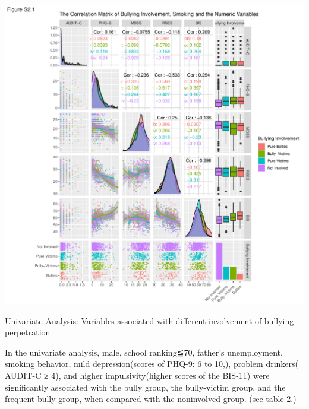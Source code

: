 \documentclass[
]{article}
\newenvironment{Shaded}{\begin{snugshade}}{\end{snugshade}}
\newcommand{\DataTypeTok}[1]{\textcolor[rgb]{0.13,0.29,0.53}{#1}}
\newcommand{\DecValTok}[1]{\textcolor[rgb]{0.00,0.00,0.81}{#1}}
\newcommand{\KeywordTok}[1]{\textcolor[rgb]{0.13,0.29,0.53}{\textbf{#1}}}
\newcommand{\NormalTok}[1]{#1}
\newcommand{\OperatorTok}[1]{\textcolor[rgb]{0.81,0.36,0.00}{\textbf{#1}}}
\begin{document}
\includegraphics{Manuscript_files/figure-latex/unnamed-chunk-2-1.pdf}

Univariate Analysis: Variables associated with different involvement of
bullying perpetration

In the univariate analysis, male, school ranking≦70, father's
unemployment, smoking behavior, mild depression(scores of PHQ-9: 6 to
10,), problem drinkers( AUDIT-C ≥ 4), and higher impulsivity(higher
scores of the BIS-11) were significantly associated with the bully
group, the bully-victim group, and the frequent bully group, when
compared with the noninvolved group. (see table 2.)

\begin{Shaded}
\end{Shaded}
\end{document}
